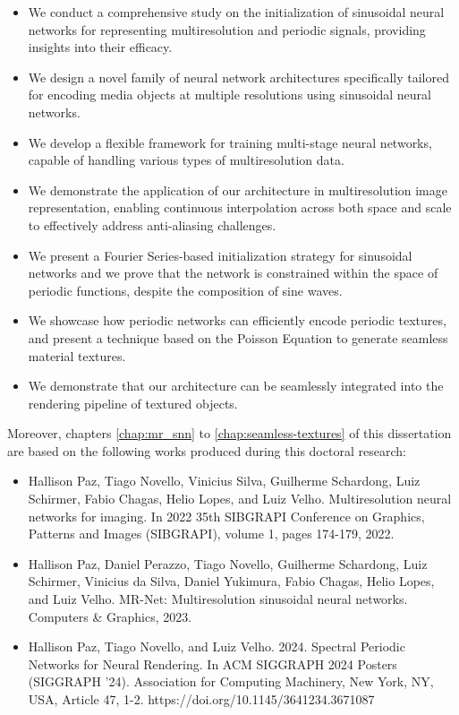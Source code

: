 \begin{itemize}
    \item We conduct a comprehensive study on the initialization of sinusoidal neural networks for representing multiresolution and periodic signals, providing insights into their efficacy.
    \item We design a novel family of neural network architectures specifically tailored for encoding media objects at multiple resolutions using sinusoidal neural networks.
    \item We develop a flexible framework for training multi-stage neural networks, capable of handling various types of multiresolution data.
    \item We demonstrate the application of our architecture in multiresolution image representation, enabling continuous interpolation across both space and scale to effectively address anti-aliasing challenges.
    \item We present a Fourier Series-based initialization strategy for sinusoidal networks and we prove that the network is constrained within the space of periodic functions, despite the composition of sine waves.
    \item We showcase how periodic networks can efficiently encode periodic textures, and present a technique based on the Poisson Equation to generate seamless material textures.
    \item We demonstrate that our architecture can be seamlessly integrated into the  rendering pipeline of textured objects.
\end{itemize}

Moreover, chapters \ref{chap:mr_snn} to \ref{chap:seamless-textures} of this dissertation are based on the following works produced during this doctoral research:

\begin{itemize}
    \item Hallison Paz, Tiago Novello, Vinicius Silva, Guilherme Schardong, Luiz Schirmer, Fabio Chagas, Helio Lopes, and Luiz Velho. Multiresolution neural networks for imaging. In 2022 35th SIBGRAPI Conference on Graphics, Patterns and Images (SIBGRAPI), volume 1, pages 174-179, 2022.
    \item Hallison Paz, Daniel Perazzo, Tiago Novello, Guilherme Schardong, Luiz Schirmer, Vinicius da Silva, Daniel Yukimura, Fabio Chagas, Helio Lopes, and Luiz Velho. MR-Net: Multiresolution sinusoidal neural networks. Computers \& Graphics, 2023.
    \item Hallison Paz, Tiago Novello, and Luiz Velho. 2024. Spectral Periodic Networks for Neural Rendering. In ACM SIGGRAPH 2024 Posters (SIGGRAPH '24). Association for Computing Machinery, New York, NY, USA, Article 47, 1-2. https://doi.org/10.1145/3641234.3671087
\end{itemize}


